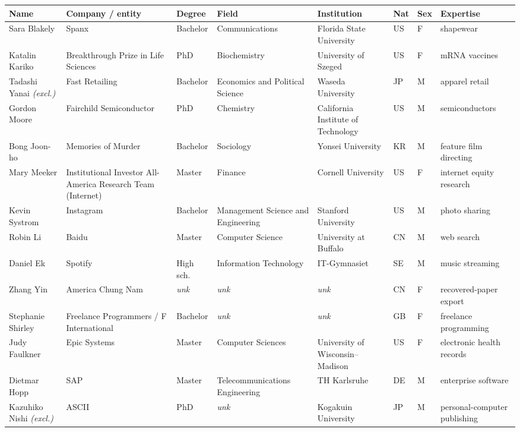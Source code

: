 \documentclass[11pt]{article}
\begin{document}
\footnotesize
\setlength{\tabcolsep}{3.2pt}
\begin{longtable}{@{}p{2.4cm}p{2.5cm}p{1.35cm}p{1.9cm}p{2.1cm}p{0.5cm}p{0.45cm}p{2.2cm}@{}}
\toprule \textbf{Name} & \textbf{Company / entity} & \textbf{Degree} & \textbf{Field} & \textbf{Institution} & \textbf{Nat} & \textbf{Sex} & \textbf{Expertise} \\ \midrule \endhead
Sara Blakely & Spanx & Bachelor & Communications & Florida State University & US & F & shapewear \\
Katalin Kariko & Breakthrough Prize in Life Sciences & PhD & Biochemistry & University of Szeged & US & F & mRNA vaccines \\
Tadashi Yanai \textit{\scriptsize(excl.)} & Fast Retailing & Bachelor & Economics and Political Science & Waseda University & JP & M & apparel retail \\
Gordon Moore & Fairchild Semiconductor & PhD & Chemistry & California Institute of Technology & US & M & semiconductors \\
Bong Joon-ho & Memories of Murder & Bachelor & Sociology & Yonsei University & KR & M & feature film directing \\
Mary Meeker & Institutional Investor All-America Research Team (Internet) & Master & Finance & Cornell University & US & F & internet equity research \\
Kevin Systrom & Instagram & Bachelor & Management Science and Engineering & Stanford University & US & M & photo sharing \\
Robin Li & Baidu & Master & Computer Science & University at Buffalo & CN & M & web search \\
Daniel Ek & Spotify & High sch. & Information Technology & IT-Gymnasiet & SE & M & music streaming \\
Zhang Yin & America Chung Nam & \textit{unk} & \textit{unk} & \textit{unk} & CN & F & recovered-paper export \\
Stephanie Shirley & Freelance Programmers / F International & Bachelor & \textit{unk} & \textit{unk} & GB & F & freelance programming \\
Judy Faulkner & Epic Systems & Master & Computer Sciences & University of Wisconsin–Madison & US & F & electronic health records \\
Dietmar Hopp & SAP & Master & Telecommunications Engineering & TH Karlsruhe & DE & M & enterprise software \\
Kazuhiko Nishi \textit{\scriptsize(excl.)} & ASCII & PhD & \textit{unk} & Kogakuin University & JP & M & personal-computer publishing \\

\end{longtable}
\end{document}
